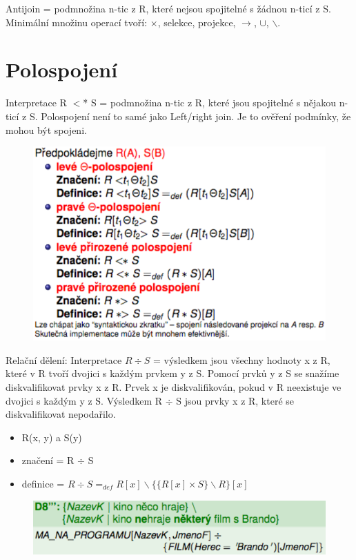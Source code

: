 \documentclass{szzclass}
\begin{document}
Antijoin = podmnožina n-tic z R, které nejsou spojitelné s žádnou n-ticí z S. Minimální množinu operací
tvoří: $\times$, selekce, projekce, $\rightarrow$, $\cup$, $\backslash$.

\section{Polospojení}
Interpretace R $<$* S = podmnožina n-tic z R, které jsou spojitelné s nějakou n-ticí z S. Polospojení
není to samé jako Left/right join. Je to ověření podmínky, že mohou být spojeni.
\begin{figure}[h!]
  \centering
  \includegraphics[width = \textwidth ]{topics/bi-spol-09/images/halfConnection.png}
\end{figure}
Relační dělení:
Interpretace $R \div S$ = výsledkem jsou všechny hodnoty x z R, které v R tvoří dvojici s každým prvkem y z S.
Pomocí prvků y z S se snažíme diskvalifikovat prvky x z R. Prvek x je diskvalifikován, pokud v R neexistuje ve dvojici s každým y z S.
Výsledkem R $\div$ S jsou prvky x z R, které se diskvalifikovat nepodařilo.
\begin{itemize}
  \item R(x, y) a S(y)
  \item značení = R $\div$ S
  \item definice = $R \div S =_{def} R[x] \backslash \{\{R[x] \times S\} \backslash R\}[x]$
\end{itemize}

\begin{figure}[h!]
  \centering
  \includegraphics[width = \textwidth ]{topics/bi-spol-09/images/division.png}
\end{figure}
\end{document}
